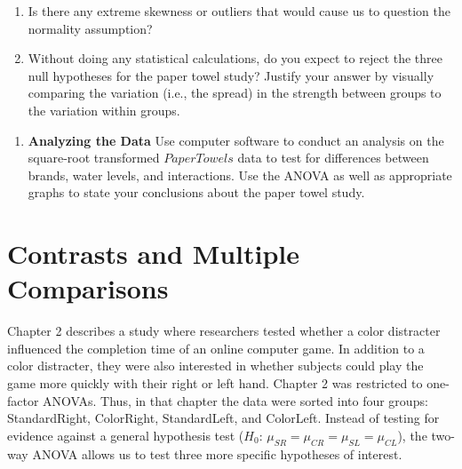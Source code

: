 \documentclass[
]{report}
\providecommand{\tightlist}{%
  \setlength{\itemsep}{0pt}\setlength{\parskip}{0pt}}
\begin{document}
\begin{enumerate}
\def\labelenumi{\alph{enumi}.}
\tightlist
\item
  Is there any extreme skewness or outliers that would cause us to question the normality assumption?
\item
  Without doing any statistical calculations, do you expect to reject the three null hypotheses for the paper towel study? Justify your answer by visually comparing the variation (i.e., the spread) in the strength between groups to the variation within groups.
\end{enumerate}

\begin{enumerate}
\def\labelenumi{\arabic{enumi}.}
\setcounter{enumi}{35}
\tightlist
\item
  \textbf{Analyzing the Data} Use computer software to conduct an analysis on the square-root transformed \(PaperTowels\) data to test for differences between brands, water levels, and interactions. Use the ANOVA as well as appropriate graphs to state your conclusions about the paper towel study.
\end{enumerate}

\section{\texorpdfstring{\textbf{Contrasts and Multiple Comparisons}}{Contrasts and Multiple Comparisons}}\label{contrasts-and-multiple-comparisons}

Chapter 2 describes a study where researchers tested whether a color distracter influenced the completion time of an online computer game. In addition to a color distracter, they were also interested in whether subjects could play the game more quickly with their right or left hand. Chapter 2 was restricted to one-factor ANOVAs. Thus, in that chapter the data were sorted into four groups: StandardRight, ColorRight, StandardLeft, and ColorLeft. Instead of testing for evidence against a general hypothesis test (\(H_0\): \(\mu_{SR} = \mu_{CR} = \mu_{SL} = \mu_{CL}\)), the two-way ANOVA allows us to test three more specific hypotheses of interest.
\end{document}
